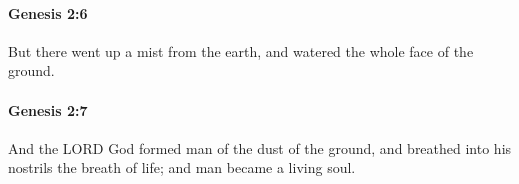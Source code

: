 		\paragraph{Genesis 2:6} %
			\label{GENESIS-2-6}

			But there went up a mist from the earth, and watered the whole face of the ground.


		\paragraph{Genesis 2:7} %
			\label{GENESIS-2-7}

			And the LORD God formed man of the dust of the ground, and breathed into his nostrils the breath of life; and man became a living soul.


